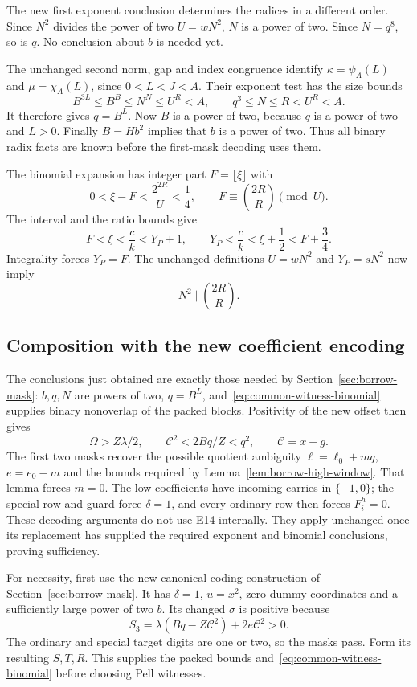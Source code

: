 The new first exponent conclusion determines the radices in a
different order. Since $N^2$ divides the power of two $U=wN^2$,
$N$ is a power of two. Since $N=q^8$, so is $q$.
No conclusion about $b$ is needed yet.

The unchanged second norm, gap and index congruence identify
$\kappa=\psi_A(L)$ and $\mu=\chi_A(L)$, since $0<L<J<A$.
Their exponent test has the size bounds
\[
 B^{3L}\le B^B\le N^N\le U^R<A,
 \qquad q^3\le N\le R<U^R<A.
\]
It therefore gives $q=B^L$. Now $B$ is a power of two, because
$q$ is a power of two and $L>0$. Finally $B=Hb^2$ implies that
$b$ is a power of two. Thus all binary radix facts are known before
the first-mask decoding uses them.

The binomial expansion has integer part $F=\lfloor\xi\rfloor$ with
\[
 0<\xi-F<\frac{2^{2R}}U<\frac14,
 \qquad F\equiv\binom{2R}{R}\pmod U.
\]
The interval and the ratio bounds give
\[
 F<\xi<\frac ck<Y_P+1,
 \qquad Y_P<\frac ck<\xi+\frac12<F+\frac34.
\]
Integrality forces $Y_P=F$. The unchanged definitions
$U=wN^2$ and $Y_P=sN^2$ now imply
\begin{equation}\label{eq:common-witness-binomial}
 N^2\mid\binom{2R}{R}.
\end{equation}

\subsection{Composition with the new coefficient encoding}

The conclusions just obtained are exactly those needed by
Section~\ref{sec:borrow-mask}: $b,q,N$ are powers of two,
$q=B^L$, and~\eqref{eq:common-witness-binomial} supplies binary
nonoverlap of the packed blocks. Positivity of the new offset then
gives
\[
 \Omega>Z\lambda/2,\qquad
 \mathcal C^2<2Bq/Z<q^2,
 \qquad\mathcal C=x+g.
\]
The first two masks recover the possible quotient ambiguity
$\ell=\ell_0+mq$, $e=e_0-m$ and the bounds required by
Lemma~\ref{lem:borrow-high-window}. That lemma forces $m=0$.
The low coefficients have incoming carries in $\{-1,0\}$; the
special row and guard force $\delta=1$, and every ordinary row
then forces $F_i^h=0$. These decoding arguments do not use E14
internally. They apply unchanged once its replacement has supplied
the required exponent and binomial conclusions, proving sufficiency.

For necessity, first use the new canonical coding construction of
Section~\ref{sec:borrow-mask}. It has $\delta=1$, $u=x^2$, zero
dummy coordinates and a sufficiently large power of two $b$.
Its changed $\sigma$ is positive because
\[
 S_3=\lambda(Bq-Z\mathcal C^2)+2e\mathcal C^2>0.
\]
The ordinary and special target digits are one or two, so the masks
pass. Form its resulting $S,T,R$. This supplies the packed bounds
and~\eqref{eq:common-witness-binomial} before choosing Pell witnesses.

